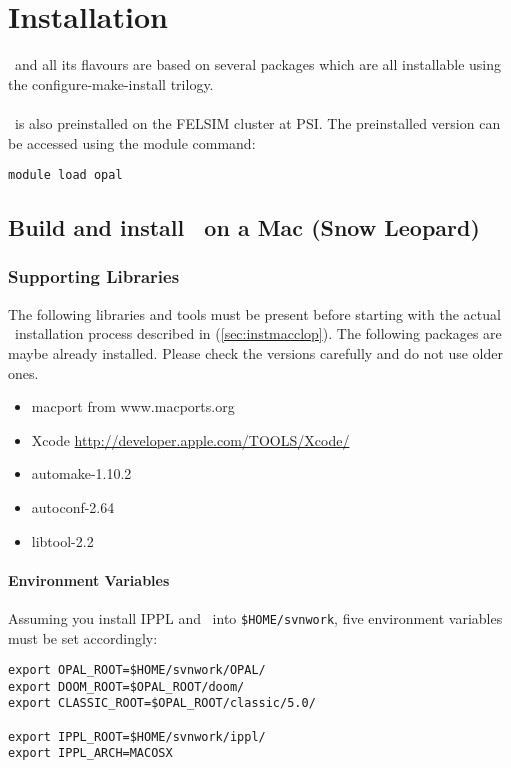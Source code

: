 \chapter{Installation}
\label{chp:installation}
\opal\ and all its flavours are based on several packages which are all installable using the configure-make-install trilogy. \\ \\
\opal\ is also preinstalled on the FELSIM cluster at PSI. The preinstalled version can be accessed 
using the module command: 
\begin{footnotesize}
\begin{verbatim}
module load opal
\end{verbatim}
\end{footnotesize}

\section{Build and install \opal\ on a Mac (Snow Leopard)}
\subsection{Supporting Libraries}
The following libraries and tools must be present before starting with the actual \opal\ installation process described in (\ref{sec:instmacclop}).
The following packages are maybe already installed. Please check the versions carefully and do not use older ones. 
\begin{itemize}
\item macport from www.macports.org
\item Xcode \url{http://developer.apple.com/TOOLS/Xcode/}
\item automake-1.10.2                
\item autoconf-2.64
\item libtool-2.2           
\end {itemize}

\subsubsection{Environment Variables}
Assuming you install IPPL and \opal\ into {\tt \$HOME/svnwork}, five 
environment variables must be set accordingly:
\begin{footnotesize}
\begin{verbatim}
export OPAL_ROOT=$HOME/svnwork/OPAL/
export DOOM_ROOT=$OPAL_ROOT/doom/
export CLASSIC_ROOT=$OPAL_ROOT/classic/5.0/

export IPPL_ROOT=$HOME/svnwork/ippl/
export IPPL_ARCH=MACOSX
\end{verbatim}
\end{footnotesize}

